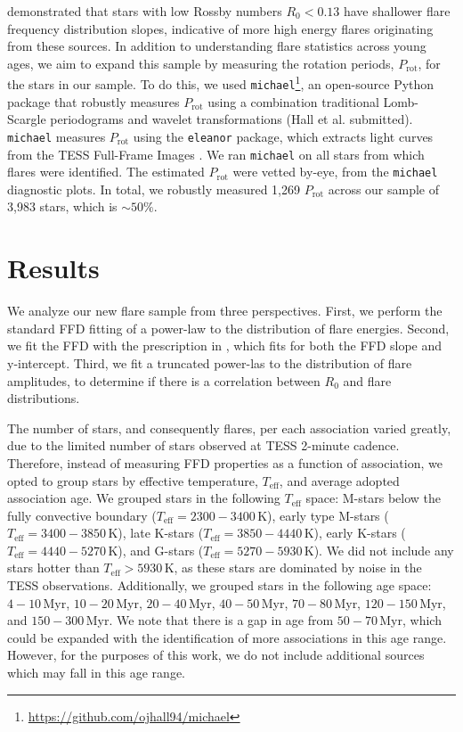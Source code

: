 \documentclass[twocolumn]{aastex631}
\begin{document}
\cite{seligman22} demonstrated that stars with low Rossby numbers $R_0 < 0.13$ have
shallower flare frequency distribution slopes, indicative of more high energy flares
originating from these sources. In addition to understanding flare statistics across
young ages, we aim to expand this sample by measuring the rotation periods, $P_\textrm{rot}$,
for the stars in our sample. To do this, we used \texttt{michael}\footnote{\url{https://github.com/ojhall94/michael}},
an open-source Python package that robustly measures $P_\textrm{rot}$ using a combination
traditional Lomb-Scargle periodograms and wavelet transformations (Hall et al. submitted).
\texttt{michael} measures $P_\textrm{rot}$ using the \texttt{eleanor} package, which
extracts light curves from the TESS Full-Frame Images \citep[FFIs;][]{feinstein19}.
We ran \texttt{michael} on all stars from which flares were identified. The estimated
$P_\textrm{rot}$ were vetted by-eye, from the \texttt{michael} diagnostic plots. In
total, we robustly measured 1,269 $P_\textrm{rot}$ across our sample of
3,983 stars, which is $\sim 50\%$.


\section{Results}\label{sec:results}

We analyze our new flare sample from three perspectives. First, we perform the standard
FFD fitting of a power-law to the distribution of flare energies. Second, we fit the FFD with the
prescription in \cite{gershberg72}, which fits for both the FFD slope and y-intercept.
Third, we fit a truncated power-las to the distribution of flare amplitudes, to determine
if there is a correlation between $R_0$ and flare distributions.

The number of stars, and consequently flares, per each association varied greatly,
due to the limited number of stars observed at TESS 2-minute cadence. Therefore, instead
of measuring FFD properties as a function of association, we opted to group stars
by effective temperature, $T_\textrm{eff}$, and average adopted association age. We
grouped stars in the following $T_\textrm{eff}$ space: M-stars below the fully
convective boundary ($T_\textrm{eff} = 2300 - 3400$\,K), early type M-stars
($T_\textrm{eff} = 3400 - 3850$\,K), late K-stars ($T_\textrm{eff} = 3850 - 4440$\,K),
early K-stars ($T_\textrm{eff} = 4440 - 5270$\,K), and G-stars ($T_\textrm{eff} = 5270 - 5930$\,K).
We did not include any stars hotter than $T_\textrm{eff} > 5930$\,K, as these stars
are dominated by noise in the TESS observations. Additionally, we grouped stars
in the following age space: $4-10$\,Myr, $10-20$\,Myr, $20-40$\,Myr, $40-50$\,Myr,
$70-80$\,Myr, $120-150$\,Myr, and $150-300$\,Myr. We note that there is a gap in
age from $50-70$\,Myr, which could be expanded with the identification of more
associations in this age range. However, for the purposes of this work, we do not
include additional sources which may fall in this age range.
\end{document}
